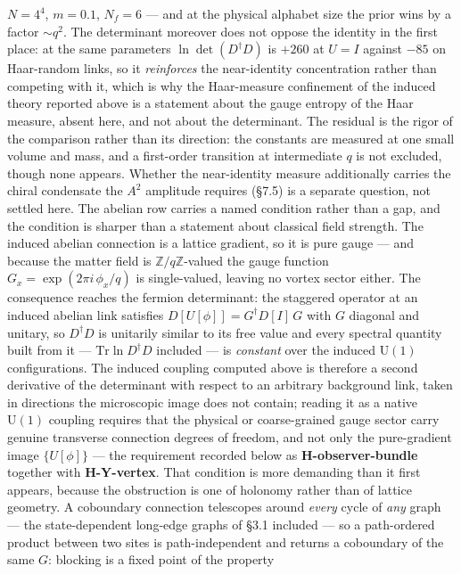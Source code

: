 \documentclass[
]{article}
\begin{document}
\(N = 4^4\), \(m = 0.1\), \(N_f = 6\) --- and at the physical alphabet
size the prior wins by a factor \(\sim q^2\). The determinant moreover
does not oppose the identity in the first place: at the same parameters
\(\ln\det(D^\dagger D)\) is \(+260\) at \(U = I\) against \(-85\) on
Haar-random links, so it \emph{reinforces} the near-identity
concentration rather than competing with it, which is why the
Haar-measure confinement of the induced theory reported above is a
statement about the gauge entropy of the Haar measure, absent here, and
not about the determinant. The residual is the rigor of the comparison
rather than its direction: the constants are measured at one small
volume and mass, and a first-order transition at intermediate \(q\) is
not excluded, though none appears. Whether the near-identity measure
additionally carries the chiral condensate the \(A^2\) amplitude
requires (§7.5) is a separate question, not settled here. The abelian
row carries a named condition rather than a gap, and the condition is
sharper than a statement about classical field strength. The induced
abelian connection is a lattice gradient, so it is pure gauge --- and
because the matter field is \(\mathbb{Z}/q\mathbb{Z}\)-valued the gauge
function \(G_x = \exp(2\pi i\,\phi_x/q)\) is single-valued, leaving no
vortex sector either. The consequence reaches the fermion determinant:
the staggered operator at an induced abelian link satisfies
\(D[U[\phi]] = G^\dagger D[I]\,G\) with \(G\) diagonal and unitary, so
\(D^\dagger D\) is unitarily similar to its free value and every
spectral quantity built from it --- \(\mathrm{Tr}\ln D^\dagger D\)
included --- is \emph{constant} over the induced \(\mathrm{U}(1)\)
configurations. The induced coupling computed above is therefore a
second derivative of the determinant with respect to an arbitrary
background link, taken in directions the microscopic image does not
contain; reading it as a native \(\mathrm{U}(1)\) coupling requires that
the physical or coarse-grained gauge sector carry genuine transverse
connection degrees of freedom, and not only the pure-gradient image
\(\{U[\phi]\}\) --- the requirement recorded below as
\textbf{H-observer-bundle} together with \textbf{H-Y-vertex}. That
condition is more demanding than it first appears, because the
obstruction is one of holonomy rather than of lattice geometry. A
coboundary connection telescopes around \emph{every} cycle of \emph{any}
graph --- the state-dependent long-edge graphs of §3.1 included --- so a
path-ordered product between two sites is path-independent and returns a
coboundary of the same \(G\): blocking is a fixed point of the property
\end{document}
